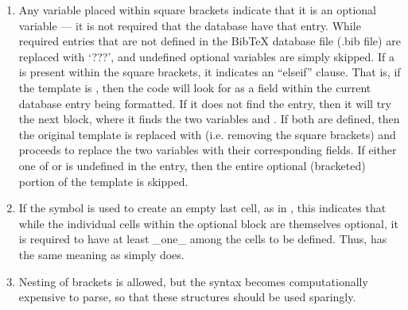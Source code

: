 \documentclass[letterpaper,10pt,english]{sphinxmanual}
\begin{document}
\begin{enumerate}
\item {} 
Any variable placed within square brackets \sphinxcode{\sphinxupquote{{[}{]}}} indicate that it is an optional variable — it is not required that the database have that entry. While required entries that are not defined in the BibTeX database file (.bib file) are replaced with ‘???’, and undefined optional variables are simply skipped. If a \sphinxcode{\sphinxupquote{\textbar{}}} is present within the square brackets, it indicates an “elseif” clause. That is, if the template is , then the code will look for  as a field within the current database entry being formatted. If it does not find the entry, then it will try the next block, where it finds the two variables  and . If both are defined, then the original template  is replaced with  (i.e. removing the square brackets) and proceeds to replace the two variables with their corresponding fields. If either one of  or  is undefined in the entry, then the entire optional (bracketed) portion of the template is skipped.

\item {} 
If the \sphinxcode{\sphinxupquote{\textbar{}}} symbol is used to create an empty last cell, as in , this indicates that while the individual cells within the optional block are themselves optional, it is required to have at least \_one\_ among the cells to be defined. Thus,  has the same meaning as simply  does.

\item {} 
Nesting of \sphinxcode{\sphinxupquote{{[}{]}}} brackets is allowed, but the syntax becomes computationally expensive to parse, so that these structures should be used sparingly.


\end{enumerate}
\end{document}
